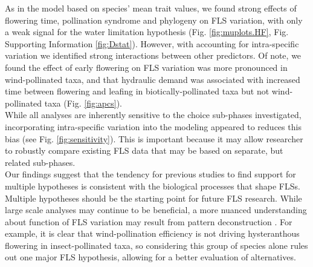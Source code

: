\documentclass[11pt]{article}
\begin{document}
\noindent As in the model based on species' mean trait values, we found strong effects of flowering time, pollination syndrome and phylogeny on FLS variation, with only a weak signal for the water limitation  hypothesis (Fig. \ref{fig:muplots.HF}, Fig. Supporting Information \ref{fig:Dstat}). However, with accounting for intra-specific variation we identified strong interactions between other predictors. Of note, we found the effect of early flowering on FLS variation was more pronounced in wind-pollinated taxa, and that hydraulic demand  was associated with increased time between flowering and leafing in biotically-pollinated taxa but not wind-pollinated taxa (Fig. \ref{fig:apcs}).\\

\noindent While all analyses are inherently sensitive to the choice sub-phases investigated, incorporating intra-specific variation into the modeling appeared to reduces this bias (see Fig. \ref{fig:sensitivity}). This is important because it may allow researcher to robustly compare existing FLS data that may be based on separate, but related sub-phases.\\

\noindent Our findings suggest that the tendency for previous studies to find support for multiple hypotheses \citep{Bolmgren2003,Gougherty2018,Savage2019} is consistent with the biological processes that shape FLSs. Multiple hypotheses should be the starting point for future FLS research. While large scale analyses may continue to be beneficial, a more nuanced understanding about function of FLS variation may result from pattern deconstruction \citep[i.e. grouping of species according to sub-clades or trait commonalities][]{Terribile2009}. For example,%
it is clear that wind-pollination efficiency is not driving hysteranthous flowering in insect-pollinated taxa, so considering this group of species alone rules out one major FLS hypothesis, allowing for a better evaluation of alternatives. 
\end{document}

